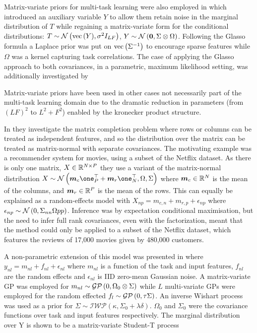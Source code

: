 Matrix-variate priors for multi-task learning were also employed in \cite{Stegle2011} which introduced an auxiliary variable $Y$ to allow them retain noise in the marginal distribution of $T$ while regaining a matrix-variate form for the conditional distributions: $T\sim\mathcal{N} \left( {\text{vec}\left(Y\right)}, {\sigma^2 I_{LF}} \right)$, $Y\sim\mathcal{N} \left( {\bm 0}, {\Sigma \otimes \Omega} \right)$. Following the Glasso formula a Laplace prior was put on $\text{vec}\left({\Sigma}^{-1}\right)$ to encourage sparse features while $\Omega$ was a kernel capturing task correlations. The case of applying the Glasso approach to both covariances, in a parametric, maximum likelihood setting, was additionally investigated by \cite{Tsiligkaridis2012b}\cite{Tsiligkaridis2012}

Matrix-variate priors have been used in other cases not necessarily part of the multi-task learning domain due to the dramatic reduction in parameters (from $(LF)^2$ to $L^2 + F^2$) enabled by the kronecker product structure.

In \cite{Allen2010} they investigate the matrix completion problem where rows or columns can be treated as independent features, and so the distribution over the matrix can be treated as matrix-normal with separate covariances. The motivating example was a recommender system for movies, using a subset of the Netflix dataset. As there is only one matrix, $X \in { \mathbb{R}^{N \times P} }$ they use a variant of the matrix-normal distribution $X \sim \mnor{\vv{m}_c \one_P\T + \vv{m}_r \one_N\T}{\Omega}{\Sigma}$ where $\bm m_c \in { \mathbb{R}^{N} }$ is the mean of the columns, and $\bm m_r \in { \mathbb{R}^{P} }$ is the mean of the rows. This can equally be explained as a random-effects model with $X_{np} = m_{c,n} + m_{r,p} + \epsilon_{np}$ where $\epsilon_{np} \sim \mathcal{N} \left( {0}, {\Sigma_{nn}\Omega{pp}} \right)$. Inference was by expectation conditional maximisation, but the need to infer full rank covariances, even with the factorization, meant that the method could only be applied to a subset of the Netflix dataset, which features the reviews of 17,000 movies given by 480,000 customers. 

A non-parametric extension of this model was presented in\cite{Yu2009} where $y_{nl} = m_{nl} + f_{nl} + \epsilon_{nl}$ where $m_{nl}$ is a function of the task and input features, $f_{nl}$ are the random effects and $\epsilon_{nl}$ is IID zero-mean Gaussian noise. A matrix-variate GP was employed for $m_{nl} \sim \mathcal{GP} \left( {0}, \Omega_0 \otimes \Sigma \right)$ while $L$ multi-variate GPs were employed for the random effected $f_{l} \sim \mathcal{GP} \left( {0}, \tau \Sigma \right)$. An inverse Wishart process\cite{Dawid1981} was used as a prior for $\Sigma \sim \mathcal{IWP} \left(\kappa, \Sigma_0 + \lambda\delta\right)$. $\Omega_0$ and $\Sigma_0$ were the covariance functions over task and input features respectively. The marginal distribution over Y is shown to be a matrix-variate Student-T process



